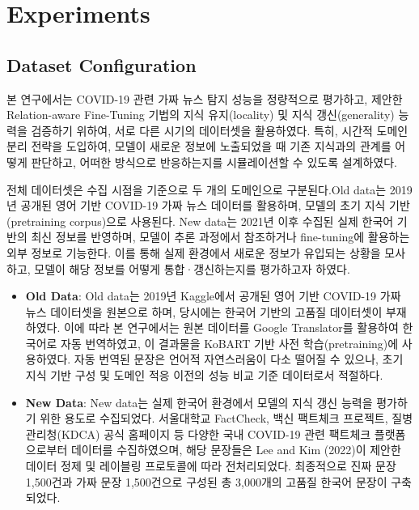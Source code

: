 \documentclass[a4paper,fleqn]{cas-sc}
\begin{document}






\section{Experiments}

\subsection{Dataset Configuration}

본 연구에서는 COVID-19 관련 가짜 뉴스 탐지 성능을 정량적으로 평가하고, 제안한 Relation-aware Fine-Tuning 기법의 지식 유지(locality) 및 지식 갱신(generality) 능력을 검증하기 위하여, 서로 다른 시기의 데이터셋을 활용하였다. 특히, 시간적 도메인 분리 전략을 도입하여, 모델이 새로운 정보에 노출되었을 때 기존 지식과의 관계를 어떻게 판단하고, 어떠한 방식으로 반응하는지를 시뮬레이션할 수 있도록 설계하였다.

전체 데이터셋은 수집 시점을 기준으로 두 개의 도메인으로 구분된다.Old data는 2019년 공개된 영어 기반 COVID-19 가짜 뉴스 데이터를 활용하며, 모델의 초기 지식 기반(pretraining corpus)으로 사용된다.  New data는 2021년 이후 수집된 실제 한국어 기반의 최신 정보를 반영하며, 모델이 추론 과정에서 참조하거나 fine-tuning에 활용하는 외부 정보로 기능한다.
이를 통해 실제 환경에서 새로운 정보가 유입되는 상황을 모사하고, 모델이 해당 정보를 어떻게 통합·갱신하는지를 평가하고자 하였다.

\begin{itemize}
    \item{\textbf{Old Data}:
    Old data는 2019년 Kaggle에서 공개된 영어 기반 COVID-19 가짜 뉴스 데이터셋을 원본으로 하며, 당시에는 한국어 기반의 고품질 데이터셋이 부재하였다. 이에 따라 본 연구에서는 원본 데이터를 Google Translator를 활용하여 한국어로 자동 번역하였고, 이 결과물을 KoBART 기반 사전 학습(pretraining)에 사용하였다.
자동 번역된 문장은 언어적 자연스러움이 다소 떨어질 수 있으나, 초기 지식 기반 구성 및 도메인 적응 이전의 성능 비교 기준 데이터로서 적절하다.}
    \item{\textbf{New Data}:
    New data는 실제 한국어 환경에서 모델의 지식 갱신 능력을 평가하기 위한 용도로 수집되었다. 서울대학교 FactCheck, 백신 팩트체크 프로젝트, 질병관리청(KDCA) 공식 홈페이지 등 다양한 국내 COVID-19 관련 팩트체크 플랫폼으로부터 데이터를 수집하였으며, 해당 문장들은 Lee and Kim (2022)이 제안한 데이터 정제 및 레이블링 프로토콜에 따라 전처리되었다. 최종적으로 진짜 문장 1,500건과 가짜 문장 1,500건으로 구성된 총 3,000개의 고품질 한국어 문장이 구축되었다.}
    
\end{itemize}  
\end{document}
